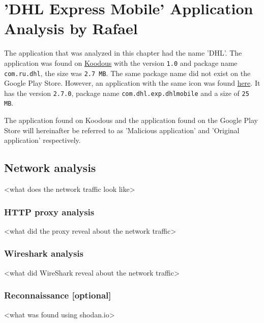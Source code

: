 \section{'DHL Express Mobile' Application Analysis by Rafael}

The application that was analyzed in this chapter had the name 'DHL'.
The application was found on \href{https://koodous.com/apks/38ff459a46e9ea6d63a83c1eddb640626fef562cd1bcb0ab3823c4770d07d0fb}{Koodous} with the version \texttt{1.0} and package name \texttt{com.ru.dhl}, the size was \texttt{2.7 MB}.
The same package name did not exist on the Google Play Store. However, an application with the same icon was found \href{https://play.google.com/store/apps/details?id=com.dhl.exp.dhlmobile}{here}. It has the version \texttt{2.7.0}, package name \texttt{com.dhl.exp.dhlmobile} and a size of \texttt{25 MB}.

The application found on Koodous and the application found on the Google Play Store will hereinafter be referred to as 'Malicious application' and 'Original application' respectively.






\newpage
\subsection{Network analysis}

<what does the network traffic look like>

\subsubsection{HTTP proxy analysis}

<what did the proxy reveal about the network traffic>

\subsubsection{Wireshark analysis}

<what did WireShark reveal about the network traffic>

\subsubsection{Reconnaissance [optional]}

<what was found using shodan.io>

